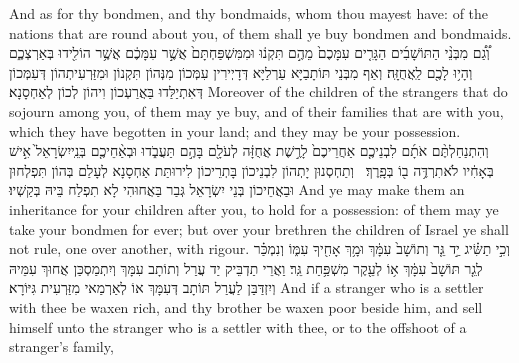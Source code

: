 {And as for thy bondmen, and thy bondmaids, whom thou mayest have: of the nations that are round about you, of them shall ye buy bondmen and bondmaids.}{}
{וְ֠גַ֠ם מִבְּנֵ֨י הַתּוֹשָׁבִ֜ים הַגָּרִ֤ים עִמָּכֶם֙ מֵהֶ֣ם תִּקְנ֔וּ וּמִמִּשְׁפַּחְתָּם֙ אֲשֶׁ֣ר עִמָּכֶ֔ם אֲשֶׁ֥ר הוֹלִ֖ידוּ בְּאַרְצְכֶ֑ם וְהָי֥וּ לָכֶ֖ם לַֽאֲחֻזָּֽה׃}
{וְאַף מִבְּנֵי תּוֹתָבַיָּא עַרְלַיָּא דְּדָיְירִין עִמְּכוֹן מִנְּהוֹן תִּקְנוֹן וּמִזַּרְעִיתְהוֹן דְּעִמְּכוֹן דְּאִתְיַלַּדוּ בַּאֲרַעְכוֹן וִיהוֹן לְכוֹן לְאַחְסָנָא׃}
{Moreover of the children of the strangers that do sojourn among you, of them may ye buy, and of their families that are with you, which they have begotten in your land; and they may be your possession.}{}
{וְהִתְנַחַלְתֶּ֨ם אֹתָ֜ם לִבְנֵיכֶ֤ם אַחֲרֵיכֶם֙ לָרֶ֣שֶׁת אֲחֻזָּ֔ה לְעֹלָ֖ם בָּהֶ֣ם תַּעֲבֹ֑דוּ וּבְאַ֨חֵיכֶ֤ם בְּנֵֽי\maqqaf יִשְׂרָאֵל֙ אִ֣ישׁ בְּאָחִ֔יו לֹא\maqqaf תִרְדֶּ֥ה ב֖וֹ בְּפָֽרֶךְ׃ \setuma }
{וְתַחְסְנוּן יָתְהוֹן לִבְנֵיכוֹן בָּתְרֵיכוֹן לִירוּתַּת אַחְסָנָא לְעָלַם בְּהוֹן תִּפְלְחוּן וּבַאֲחֵיכוֹן בְּנֵי יִשְׂרָאֵל גְּבַר בַּאֲחוּהִי לָא תִפְלַח בֵּיהּ בְּקַשְׁיוּ׃}
{And ye may make them an inheritance for your children after you, to hold for a possession: of them may ye take your bondmen for ever; but over your brethren the children of Israel ye shall not rule, one over another, with rigour.}{}
{וְכִ֣י תַשִּׂ֗יג יַ֣ד גֵּ֤ר וְתוֹשָׁב֙ עִמָּ֔ךְ וּמָ֥ךְ אָחִ֖יךָ עִמּ֑וֹ וְנִמְכַּ֗ר לְגֵ֤ר תּוֹשָׁב֙ עִמָּ֔ךְ א֥וֹ לְעֵ֖קֶר מִשְׁפַּ֥חַת גֵּֽר׃}
{וַאֲרֵי תַדְבֵּיק יַד עֲרַל וְתוֹתָב עִמָּךְ וְיִתְמַסְכַּן אֲחוּךְ עִמֵּיהּ וְיִזְדַּבַּן לַעֲרַל תּוֹתָב דְּעִמָּךְ אוֹ לְאַרְמַאי מִזַּרְעִית גִּיּוֹרָא׃}
{And if a stranger who is a settler with thee be waxen rich, and thy brother be waxen poor beside him, and sell himself unto the stranger who is a settler with thee, or to the offshoot of a stranger’s family,}{}

